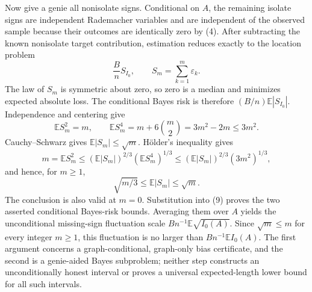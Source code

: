 Now give a genie all nonisolate signs.  Conditional on \(A\), the remaining isolate signs are independent Rademacher variables and are independent of the observed sample because their outcomes are identically zero by (4).  After subtracting the known nonisolate target contribution, estimation reduces exactly to the location problem
\[
 \frac BnS_{I_0},\qquad S_m=\sum_{k=1}^m\varepsilon_k.
\tag{9}
\]
The law of \(S_m\) is symmetric about zero, so zero is a median and minimizes expected absolute loss.  The conditional Bayes risk is therefore \((B/n)\mathbb E|S_{I_0}|\).  Independence and centering give
\[
 \mathbb ES_m^2=m,\qquad
 \mathbb ES_m^4=m+6\binom m2=3m^2-2m\leq3m^2.
\tag{10}
\]
Cauchy--Schwarz gives \(\mathbb E|S_m|\leq\sqrt m\).  Hölder's inequality gives
\[
 m=\mathbb ES_m^2
 \leq(\mathbb E|S_m|)^{2/3}(\mathbb ES_m^4)^{1/3}
 \leq(\mathbb E|S_m|)^{2/3}(3m^2)^{1/3},
\]
and hence, for \(m\geq1\),
\[
 \sqrt{m/3}\leq\mathbb E|S_m|\leq\sqrt m.
\tag{11}
\]
The conclusion is also valid at \(m=0\).  Substitution into (9) proves the two asserted conditional Bayes-risk bounds.  Averaging them over \(A\) yields the unconditional missing-sign fluctuation scale \(Bn^{-1}\mathbb E\sqrt{I_0(A)}\).  Since \(\sqrt m\leq m\) for every integer \(m\geq1\), this fluctuation is no larger than \(Bn^{-1}\mathbb EI_0(A)\).  The first argument concerns a graph-conditional, graph-only bias certificate, and the second is a genie-aided Bayes subproblem; neither step constructs an unconditionally honest interval or proves a universal expected-length lower bound for all such intervals.